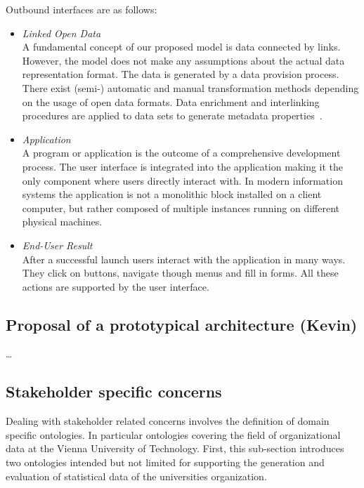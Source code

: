 \documentclass{article}
\begin{document}
Outbound interfaces are as follows:
\begin{itemize}
	\item \textit{Linked Open Data}~\\
	A fundamental concept of our proposed model is data connected by links. However, the model does not make any assumptions about the actual data representation format. The data is generated by a data provision process. There exist (semi-) automatic and manual transformation methods depending on the usage of open data formats. Data enrichment and interlinking procedures are applied to data sets to generate metadata properties~\cite{inproceedings:soa-architecture}. 
	\item \textit{Application}~\\
	A program or application is the outcome of a comprehensive development process. The user interface is integrated into the application making it the only component where users directly interact with. In modern information systems the application is not a monolithic block installed on a client computer, but rather composed of multiple instances running on different physical machines. 
	\item \textit{End-User Result}~\\
	After a successful launch users interact with the application in many ways. They click on buttons, navigate though menus and fill in forms. All these actions are supported by the user interface.
\end{itemize}

\subsection{Proposal of a prototypical architecture (Kevin)}
\ldots

\subsection{Stakeholder specific concerns}
\label{sec:ontologies}
Dealing with stakeholder related concerns involves the definition of domain specific ontologies. In particular ontologies covering the field of organizational data at the Vienna University of Technology. First, this sub-section introduces two ontologies intended but not limited for supporting the generation and evaluation of statistical data of the universities organization. 
\end{document}
